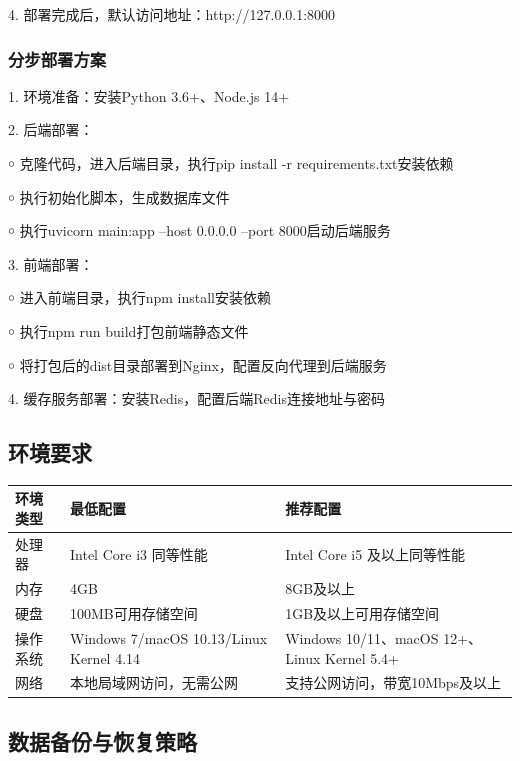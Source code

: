 \documentclass[12pt, a4paper]{article}
\begin{document}
4. 部署完成后，默认访问地址：http://127.0.0.1:8000

\subsubsection{分步部署方案}

1. 环境准备：安装Python 3.6+、Node.js 14+

2. 后端部署：

￮ 克隆代码，进入后端目录，执行pip install -r requirements.txt安装依赖

￮ 执行初始化脚本，生成数据库文件

￮ 执行uvicorn main:app --host 0.0.0.0 --port 8000启动后端服务

3. 前端部署：

￮ 进入前端目录，执行npm install安装依赖

￮ 执行npm run build打包前端静态文件

￮ 将打包后的dist目录部署到Nginx，配置反向代理到后端服务

4. 缓存服务部署：安装Redis，配置后端Redis连接地址与密码

\subsection{环境要求}

\begin{table}[H]
    \centering
    \begin{tabularx}{\linewidth}{|l|X|X|}
        \hline
        环境类型 & 最低配置 & 推荐配置 \\
        \hline
        处理器 & Intel Core i3 同等性能 & Intel Core i5 及以上同等性能 \\
        \hline
        内存 & 4GB & 8GB及以上 \\
        \hline
        硬盘 & 100MB可用存储空间 & 1GB及以上可用存储空间 \\
        \hline
        操作系统 & Windows 7/macOS 10.13/Linux Kernel 4.14 & Windows 10/11、macOS 12+、Linux Kernel 5.4+ \\
        \hline
        网络 & 本地局域网访问，无需公网 & 支持公网访问，带宽10Mbps及以上 \\
        \hline
    \end{tabularx}
\end{table}

\subsection{数据备份与恢复策略}
\end{document}
